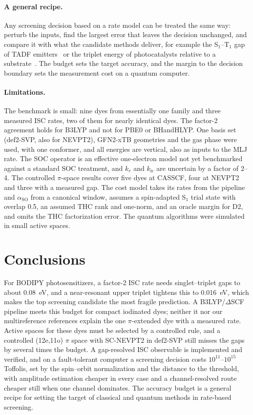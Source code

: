 \documentclass[journal=jctcce,manuscript=article,layout=twocolumn]{achemso}
\newcommand{\aso}{\alpha_\mathrm{SO}}
\begin{document}
\paragraph{A general recipe.} Any screening decision based on a rate model can be treated the same
way: perturb the inputs, find the largest error that leaves the decision unchanged, and compare it with
what the candidate methods deliver, for example the S$_1$--T$_1$ gap of TADF
emitters~\cite{Uoyama2012,Wong2017} or the triplet energy of photocatalysts relative to a
substrate~\cite{StriethKalthoff2018}. The budget sets the target accuracy, and the margin to the decision
boundary sets the measurement cost on a quantum computer.

\paragraph{Limitations.} The benchmark is small: nine dyes from essentially one family and three
measured ISC rates, two of them for nearly identical dyes. The factor-2 agreement holds for B3LYP and not
for PBE0 or BHandHLYP. One basis set (def2-SVP, also for NEVPT2), GFN2-xTB geometries and the gas phase were
used, with one conformer, and all energies are vertical, also as inputs to the MLJ rate. The SOC operator is
an effective one-electron model not yet benchmarked against a standard SOC treatment, and $k_r$ and
$k_\mathrm{ic}$ are uncertain by a factor of 2--4. The controlled $\pi$-space results cover five dyes at
CASSCF, four at NEVPT2 and three with a measured gap. The cost model takes its rates from the pipeline and
$\aso$ from a canonical window, assumes a spin-adapted S$_1$ trial state with overlap 0.5, an assumed THC rank
and one-norm, and an oracle margin for D2, and omits the THC factorization error. The quantum algorithms were
simulated in small active spaces.

\section{Conclusions}

For BODIPY photosensitizers, a factor-2 ISC rate needs singlet--triplet gaps to about 0.08~eV, and a
near-resonant upper triplet tightens this to 0.016~eV, which makes the top screening candidate the most
fragile prediction. A B3LYP/$\Delta$SCF pipeline meets this budget for compact iodinated dyes; neither it nor
our multireference references explain the one $\pi$-extended dye with a measured rate. Active spaces for
these dyes must be selected by a controlled rule, and a controlled (12e,11o) $\pi$ space with SC-NEVPT2 in
def2-SVP still misses the gaps by several times the budget. A gap-resolved ISC observable is implemented and
verified, and on a fault-tolerant computer a screening decision costs $10^{11}$--$10^{15}$ Toffolis, set by the
spin--orbit normalization and the distance to the threshold, with amplitude estimation cheaper in every case
and a channel-resolved route cheaper still when one channel dominates. The accuracy budget is a general
recipe for setting the target of classical and quantum methods in rate-based screening.
\end{document}
